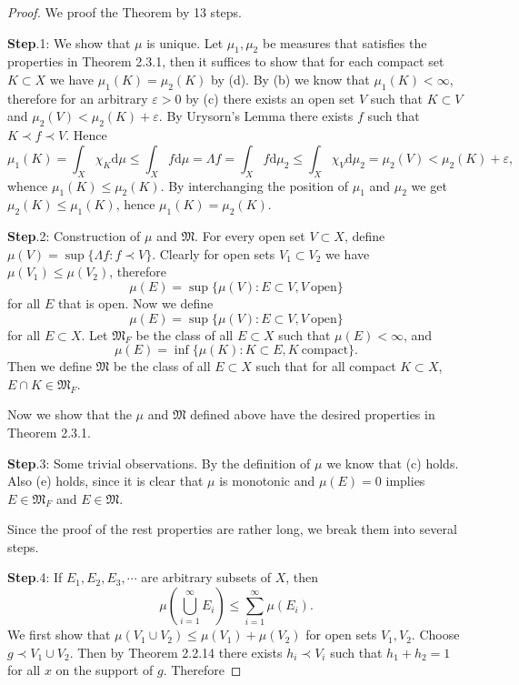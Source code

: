 \begin{proof}
We proof the Theorem by 13 steps.\par
\textbf{Step}.1: We show that $\mu$ is unique. Let $\mu_1,\mu_2$ be measures that satisfies the properties in Theorem 2.3.1, then it suffices to show that for each compact set $K\subset X$ we have $\mu_1(K)=\mu_2(K)$ by (d). By (b) we know that $\mu_1(K)<\infty$, therefore for an arbitrary $\varepsilon>0$ by (c) there exists an open set $V$ such that $K\subset V$ and $\mu_2(V)<\mu_2(K)+\varepsilon$. By Urysorn's Lemma there exists $f$ such that $K\prec f\prec V$. Hence 
$$
\mu _1\left( K \right) =\int_X{\chi _K\mathrm{d}\mu}\le \int_X{f\mathrm{d}\mu}=\Lambda f=\int_X{f\mathrm{d}\mu _2}\le \int_X{\chi _V\mathrm{d}\mu _2}=\mu _2\left( V \right) <\mu _2\left( K \right) +\varepsilon ,
$$
whence $\mu_1(K)\le\mu_2(K)$. By interchanging the position of $\mu_1$ and $\mu_2$ we get $\mu_2(K)\le\mu_1(K)$, hence $\mu_1(K)=\mu_2(K)$.\par
\textbf{Step}.2: Construction of $\mu$ and $\mathfrak{M}$. For every open set $V\subset X$, define $\mu(V)=\sup\{\Lambda f:f\prec V\}$. Clearly for open sets $V_1\subset V_2$ we have $\mu(V_1)\le\mu(V_2)$, therefore 
$$\mu(E)=\sup\{\mu(V):E\subset V,V\ \text{open}\}$$
for all $E$ that is open. Now we define 
$$\mu(E)=\sup\{\mu(V):E\subset V,V\ \text{open}\}$$
for all $E\subset X$. Let $\mathfrak{M}_F$ be the class of all $E\subset X$ such that $\mu(E)<\infty$, and 
$$\mu(E)=\inf\{\mu(K):K\subset E,K\ \text{compact}\}.$$
Then we define $\mathfrak{M}$ be the class of all $E\subset X$ such that for all compact $K\subset X$, $E\cap K\in\mathfrak{M}_F$.\par
Now we show that the $\mu$ and $\mathfrak{M}$ defined above have the desired properties in Theorem 2.3.1.\par
\textbf{Step}.3: Some trivial observations. By the definition of $\mu$ we know that (c) holds. Also (e) holds, since it is clear that $\mu$ is monotonic and $\mu(E)=0$ implies $E\in\mathfrak{M}_F$ and $E\in\mathfrak{M}$.\par
Since the proof of the rest properties are rather long, we break them into several steps.\par
\textbf{Step}.4: If $E_1,E_2,E_3,\cdots$ are arbitrary subsets of $X$, then 
$$\mu\left(\bigcup_{i=1}^\infty E_i\right)\le\sum_{i=1}^\infty\mu(E_i).$$
We first show that $\mu(V_1\cup V_2)\le\mu(V_1)+\mu(V_2)$ for open sets $V_1,V_2$. Choose $g\prec V_1\cup V_2$. Then by Theorem 2.2.14 there exists $h_i\prec V_i$ such that $h_1+h_2=1$ for all $x$ on the support of $g$. Therefore 

\end{proof}
